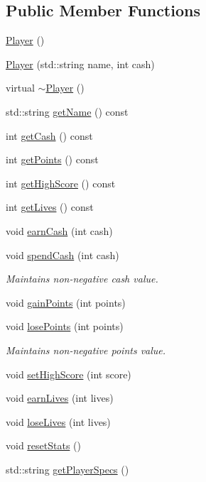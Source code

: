 \subsection*{Public Member Functions}
\begin{DoxyCompactItemize}
\item 
\hyperlink{class_player_affe0cc3cb714f6deb4e62f0c0d3f1fd8}{Player} ()
\item 
\hyperlink{class_player_a41b9f054a50fe2cd56b06ad177f87cb5}{Player} (std\+::string name, int cash)
\item 
virtual \hyperlink{class_player_a749d2c00e1fe0f5c2746f7505a58c062}{$\sim$\+Player} ()
\item 
std\+::string \hyperlink{class_player_ad4c6a95f1cf69c44d0c585465b101c70}{get\+Name} () const 
\item 
int \hyperlink{class_player_aee3d68c568ac6d2346852a47fdc25c01}{get\+Cash} () const 
\item 
int \hyperlink{class_player_a2d9d894f68e52cc6d9dfdbc0e6cd3e53}{get\+Points} () const 
\item 
int \hyperlink{class_player_ab0ccdfef92f1fb141b76c03cc98e7146}{get\+High\+Score} () const 
\item 
int \hyperlink{class_player_a1cd893cbffe289dd821a5df984c8a2de}{get\+Lives} () const 
\item 
void \hyperlink{class_player_af3bdca44c57bee211d1d0ea53c11f9b3}{earn\+Cash} (int cash)
\item 
void \hyperlink{class_player_abb709d55c86f703fbd6cc5b90d31fc39}{spend\+Cash} (int cash)
\begin{DoxyCompactList}\small\item\em Maintains non-\/negative cash value. \end{DoxyCompactList}\item 
void \hyperlink{class_player_ac540cf7f9631bfd6d9c76242addd8eea}{gain\+Points} (int points)
\item 
void \hyperlink{class_player_a861005738bf21093c79383a3494f2ca8}{lose\+Points} (int points)
\begin{DoxyCompactList}\small\item\em Maintains non-\/negative points value. \end{DoxyCompactList}\item 
void \hyperlink{class_player_a6b8a344f52c60980f36bb28d2b7f0b6c}{set\+High\+Score} (int score)
\item 
void \hyperlink{class_player_a94ae7ed65222575524357b70e7d44592}{earn\+Lives} (int lives)
\item 
void \hyperlink{class_player_a5bb1f83134c899add66053bb08786fb0}{lose\+Lives} (int lives)
\item 
void \hyperlink{class_player_ad85b7618b95a6d763db0587760fd2dd3}{reset\+Stats} ()
\item 
std\+::string \hyperlink{class_player_acbc053e1bb71e1f7408d0463a722487d}{get\+Player\+Specs} ()
\end{DoxyCompactItemize}
